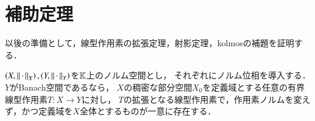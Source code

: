 \section{補助定理}
以後の準備として，線型作用素の拡張定理，射影定理，kolmosの補題を証明する．
\begin{screen}
	\begin{thm}[線型作用素の拡張]
		$\left( X,\left\|\, \cdot\, \right\|_{X} \right),\left( Y,\left\|\, \cdot\, \right\|_{Y} \right)$を$\mathbb{K}$上のノルム空間とし，
		それぞれにノルム位相を導入する．$Y$がBanach空間であるなら，
		$X$の稠密な部分空間$X_0$を定義域とする任意の有界線型作用素$T:X \rightarrow Y$に対し，
		$T$の拡張となる線型作用素で，作用素ノルムを変えず，かつ定義域を$X$全体とするものが一意に存在する．
		\label{thm:linear_operator_expansion}
	\end{thm}
\end{screen}

